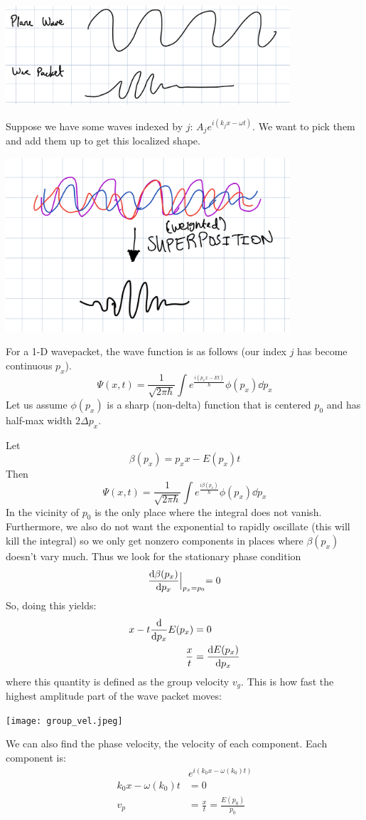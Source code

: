 \includegraphics[width=400px]{../images/wave_packet.jpeg}

Suppose we have some waves indexed by $j$: $A_j e^{i (k_j x - \omega t)}$. We want to pick them and add them up to get this localized shape.

\includegraphics[width=400px]{../images/fourier_sup.jpeg}

For a 1-D wavepacket, the wave function is as follows (our index $j$ has become continuous $p_x$).
\[ \Psi(x, t) = \frac{1}{\sqrt{2 \pi \hbar}} \int e^{\frac{i(p_x x - Et)}{\hbar}} \phi(p_x) \dd{p_x} \]
Let us assume $\phi(p_x)$ is a sharp (non-delta) function that is centered $p_0$ and has half-max width $2 \Delta p_x$.

Let
\[ \beta(p_x) = p_x x - E(p_x) t \]
Then
\[ \Psi(x, t) = \frac{1}{\sqrt{2 \pi \hbar}} \int e^{\frac{i\beta(p_x)}{\hbar}} \phi(p_x) \dd{p_x} \]
In the vicinity of $p_0$ is the only place where the integral does not vanish. Furthermore, we also do not want the exponential to rapidly oscillate (this will kill the integral)
so we only get nonzero components in places where $\beta(p_x)$ doesn't vary much. Thus we look for the stationary phase condition
\[ \derivative{\beta(p_x)}{p_x} \Bigl|_{p_x = p_0} = 0 \]
So, doing this yields:
\begin{align*}
    x - t \derivative{}{p_x} E(p_x) &= 0 \\
    \frac{x}{t} &= \derivative{E(p_x)}{p_x}
\end{align*}
where this quantity is defined as the group velocity $v_g$. This is how fast the highest amplitude part of the wave packet moves:

\texttt{[image: group\_vel.jpeg]}

We can also find the phase velocity, the velocity of each component. Each component is:
\begin{align*}
    &e^{i(k_0 x - \omega(k_0) t)} \\
    k_0 x - \omega(k_0)t &= 0 \\
    v_p &= \frac{x}{t} = \frac{E(p_0)}{p_0}
\end{align*}


